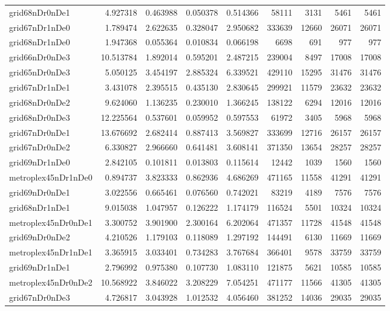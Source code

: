 \begin{longtable}{|l|r|r|r|r|r|r|r|r|}
grid68nDr0nDe1 & 4.927318 & 0.463988 & 0.050378 & 0.514366 & 58111 & 3131 & 5461 & 5461 \\
grid67nDr1nDe0 & 1.789474 & 2.622635 & 0.328047 & 2.950682 & 333639 & 12660 & 26071 & 26071 \\
grid68nDr1nDe0 & 1.947368 & 0.055364 & 0.010834 & 0.066198 & 6698 & 691 & 977 & 977 \\
grid66nDr0nDe3 & 10.513784 & 1.892014 & 0.595201 & 2.487215 & 239004 & 8497 & 17008 & 17008 \\
grid65nDr0nDe3 & 5.050125 & 3.454197 & 2.885324 & 6.339521 & 429110 & 15295 & 31476 & 31476 \\
grid67nDr1nDe1 & 3.431078 & 2.395515 & 0.435130 & 2.830645 & 299921 & 11579 & 23632 & 23632 \\
grid68nDr0nDe2 & 9.624060 & 1.136235 & 0.230010 & 1.366245 & 138122 & 6294 & 12016 & 12016 \\
grid68nDr0nDe3 & 12.225564 & 0.537601 & 0.059952 & 0.597553 & 61972 & 3405 & 5968 & 5968 \\
grid67nDr0nDe1 & 13.676692 & 2.682414 & 0.887413 & 3.569827 & 333699 & 12716 & 26157 & 26157 \\
grid67nDr0nDe2 & 6.330827 & 2.966660 & 0.641481 & 3.608141 & 371350 & 13654 & 28257 & 28257 \\
grid69nDr1nDe0 & 2.842105 & 0.101811 & 0.013803 & 0.115614 & 12442 & 1039 & 1560 & 1560 \\
metroplex45nDr1nDe0 & 0.894737 & 3.823333 & 0.862936 & 4.686269 & 471165 & 11558 & 41291 & 41291 \\
grid69nDr0nDe1 & 3.022556 & 0.665461 & 0.076560 & 0.742021 & 83219 & 4189 & 7576 & 7576 \\
grid68nDr1nDe1 & 9.015038 & 1.047957 & 0.126222 & 1.174179 & 116524 & 5501 & 10324 & 10324 \\
metroplex45nDr0nDe1 & 3.300752 & 3.901900 & 2.300164 & 6.202064 & 471357 & 11728 & 41548 & 41548 \\
grid69nDr0nDe2 & 4.210526 & 1.179103 & 0.118089 & 1.297192 & 144491 & 6130 & 11669 & 11669 \\
metroplex45nDr1nDe1 & 3.365915 & 3.033401 & 0.734283 & 3.767684 & 366401 & 9578 & 33759 & 33759 \\
grid69nDr1nDe1 & 2.796992 & 0.975380 & 0.107730 & 1.083110 & 121875 & 5621 & 10585 & 10585 \\
metroplex45nDr0nDe2 & 10.568922 & 3.846022 & 3.208229 & 7.054251 & 471177 & 11566 & 41305 & 41305 \\
grid67nDr0nDe3 & 4.726817 & 3.043928 & 1.012532 & 4.056460 & 381252 & 14036 & 29035 & 29035 \\

\end{longtable}

